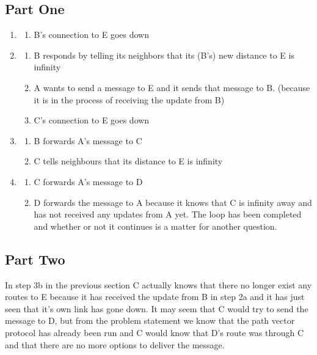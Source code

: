 \documentclass[a4paper]{article}
\begin{document}
\subsection{Part One}
\begin{enumerate}
	\item \begin{enumerate}
		\item B's connection to E goes down\\
	\end{enumerate}

	\item \begin{enumerate}
		\item B responds by telling its neighbors that its (B's) new distance to E is infinity\\
		\item A wants to send a message to E and it sends that message to B. (because it is in the process of receiving the update from B)\\
		\item C's connection to E goes down\\
	\end{enumerate}

	\item \begin{enumerate}
		\item B forwards A's message to C\\
		\item C tells neighbours that its distance to E is infinity\\
	\end{enumerate}

	\item \begin{enumerate}
		\item C forwards A's message to D\\
		\item D forwards the message to A because it knows that C is infinity away and has not received any updates from A yet. The loop has been completed and whether or not it continues is a matter for another question.\\
	\end{enumerate}

\end{enumerate}

\subsection{Part Two}
In step 3b in the previous section C actually knows that there no longer exist any routes to E because it has received
the update from B in step 2a and it has just seen that it's own link has gone down. It may seem that C would try to
send the message to D, but from the problem statement we know that the path vector protocol has already been run and
C would know that D's route was through C and that there are no more options to deliver the message.
\end{document}
